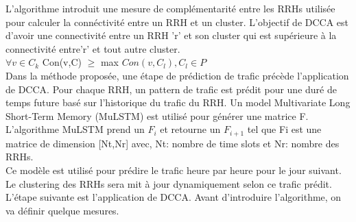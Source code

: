 \documentclass{report}
\begin{document}
L'algorithme introduit une mesure de complémentarité entre les RRHs utilisée pour calculer la connéctivité entre un RRH et un cluster.
L'objectif de DCCA est d'avoir une connectivité entre un RRH 'r' et son cluster qui est supérieure à la connectivité entre'r' et tout autre cluster.\\
$\forall v\in C_{k}$  Con(v,C) $\ge$ max $Con(v,C_{l}),C_{l} \in P$ \\
Dans la méthode proposée, une étape de prédiction de trafic précède l'application de DCCA. Pour chaque RRH, un pattern de trafic 
est prédit pour une duré de temps future basé sur l'historique du trafic du RRH. Un model Multivariate Long Short-Term Memory (MuLSTM) est utilisé 
pour générer une matrice F. L'algorithme MuLSTM prend un $F_{i}$ et retourne un $F_{i+1}$ tel que Fi est une matrice de dimension [Nt,Nr] avec, Nt: nombre de time slots et Nr: nombre des RRHs.\\
Ce modèle est utilisé pour prédire le trafic heure par heure pour le jour suivant. Le clustering des RRHs sera mit à jour dynamiquement selon ce trafic prédit. \\
L'étape suivante est l'application de DCCA. Avant d'introduire l'algorithme, on va définir quelque mesures.\\
\end{document}
